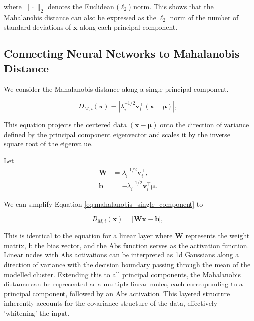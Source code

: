 where $\| \cdot \|_2$ denotes the Euclidean ($\ell_2$) norm. This shows that the Mahalanobis distance can also be expressed as the $\ell_2$ norm of the number of standard deviations of \(\mathbf{x}\) along each principal component.

\subsection{Connecting Neural Networks to Mahalanobis Distance}

We consider the Mahalanobis distance along a single principal component.

\begin{equation}
    \label{eq:mahalanobis_single_component}
    D_{M,i}(\mathbf{x}) = \left| \lambda_i^{-1/2} \mathbf{v}_i^\top (\mathbf{x} - \boldsymbol{\mu}) \right|,
\end{equation}

This equation projects the centered data $(\mathbf{x} - \boldsymbol{\mu})$ onto the direction of variance defined by the principal component eigenvector and scales it by the inverse square root of the eigenvalue.

Let 
\begin{align}
    \mathbf{W} &= \lambda_i^{-1/2} \mathbf{v}_i^\top, \\
    \mathbf{b} &= - \lambda_i^{-1/2} \mathbf{v}_i^\top \boldsymbol{\mu}.
\end{align}

We can simplify Equation \eqref{eq:mahalanobis_single_component} to

\begin{equation}
    \label{eq:mahalanobis_linear}
    D_{M,i}(\mathbf{x}) = \left| \mathbf{W} \mathbf{x} - \mathbf{b} \right|,
\end{equation}

This is identical to the equation for a linear layer where $\boldsymbol{W}$ represents the weight matrix, $\boldsymbol{b}$ the bias vector, and the Abs function serves as the activation function. Linear nodes with Abs activations can be interpreted as 1d Gaussians along a direction of variance with the decision boundary passing through the mean of the modelled cluster. Extending this to all principal components, the Mahalanobis distance can be represented as a multiple linear nodes, each corresponding to a principal component, followed by an Abs activation. This layered structure inherently accounts for the covariance structure of the data, effectively 'whitening' the input.

